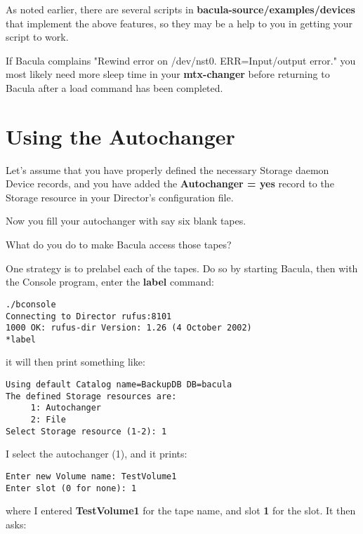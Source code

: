 As noted earlier, there are several scripts in {\bf
\lt{}bacula-source\gt{}/examples/devices} that implement the above features,
so they may be a help to you in getting your script to work. 

If Bacula complains "Rewind error on /dev/nst0. ERR=Input/output error." you
most likely need more sleep time in your {\bf mtx-changer} before returning to
Bacula after a load command has been completed.

\label{using}

\section{Using the Autochanger}

Let's assume that you have properly defined the necessary Storage daemon
Device records, and you have added the {\bf Autochanger = yes} record to the
Storage resource in your Director's configuration file. 

Now you fill your autochanger with say six blank tapes. 

What do you do to make Bacula access those tapes? 

One strategy is to prelabel each of the tapes. Do so by starting Bacula, then
with the Console program, enter the {\bf label} command: 

\footnotesize
\begin{verbatim}
./bconsole
Connecting to Director rufus:8101
1000 OK: rufus-dir Version: 1.26 (4 October 2002)
*label
\end{verbatim}
\normalsize

it will then print something like: 

\footnotesize
\begin{verbatim}
Using default Catalog name=BackupDB DB=bacula
The defined Storage resources are:
     1: Autochanger
     2: File
Select Storage resource (1-2): 1
\end{verbatim}
\normalsize

I select the autochanger (1), and it prints: 

\footnotesize
\begin{verbatim}
Enter new Volume name: TestVolume1
Enter slot (0 for none): 1
\end{verbatim}
\normalsize

where I entered {\bf TestVolume1} for the tape name, and slot {\bf 1} for the
slot. It then asks: 

